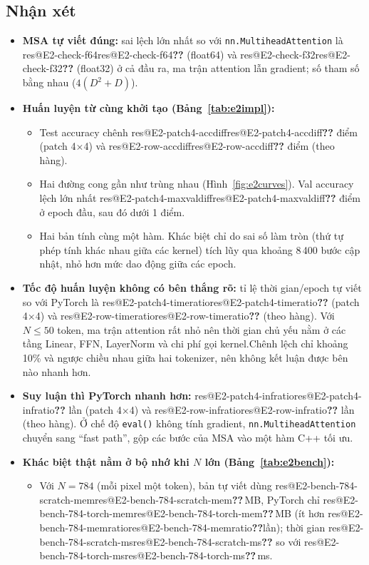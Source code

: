 \documentclass[twoside,final]{hcmut-report}
\makeatletter
\newcommand{\res}[1]{\ifcsname res@#1\endcsname\csname res@#1\endcsname\else\textbf{??}\fi}
\makeatother
\begin{document}
\subsection{Nhận xét}
\begin{itemize}
  \item \textbf{MSA tự viết đúng:} sai lệch lớn nhất so với \texttt{nn.MultiheadAttention} là
        \res{E2-check-f64} (float64) và \res{E2-check-f32} (float32) ở cả đầu ra, ma trận attention lẫn gradient; số tham số bằng nhau ($4(D^2+D)$).
  \item \textbf{Huấn luyện từ cùng khởi tạo (Bảng~\ref{tab:e2impl}):}
        \begin{itemize}
          \item Test accuracy chênh \res{E2-patch4-accdiff} điểm (patch 4$\times$4) và \res{E2-row-accdiff} điểm (theo hàng).
          \item Hai đường cong gần như trùng nhau (Hình~\ref{fig:e2curves}). Val accuracy lệch lớn nhất \res{E2-patch4-maxvaldiff} điểm ở epoch đầu, sau đó dưới 1 điểm.
          \item Hai bản tính cùng một hàm. Khác biệt chỉ do sai số làm tròn (thứ tự phép tính khác nhau giữa các kernel) tích lũy qua khoảng 8\,400 bước cập nhật, nhỏ hơn mức dao động giữa các epoch.
        \end{itemize}
  \item \textbf{Tốc độ huấn luyện không có bên thắng rõ:} tỉ lệ thời gian/epoch tự viết so với PyTorch là \res{E2-patch4-timeratio} (patch 4$\times$4) và \res{E2-row-timeratio} (theo hàng). Với $N\le 50$ token, ma trận attention rất nhỏ nên thời gian chủ yếu nằm ở các tầng Linear, FFN, LayerNorm và chi phí gọi kernel.Chênh lệch chỉ khoảng 10\% và ngược chiều nhau giữa hai tokenizer, nên không kết luận được bên nào nhanh hơn.
  \item \textbf{Suy luận thì PyTorch nhanh hơn:} \res{E2-patch4-infratio} lần (patch 4$\times$4) và \res{E2-row-infratio} lần (theo hàng). Ở chế độ \texttt{eval()} không tính gradient, \texttt{nn.MultiheadAttention} chuyển sang ``fast path'', gộp các bước của MSA vào một hàm C++ tối ưu.
  \item \textbf{Khác biệt thật nằm ở bộ nhớ khi $N$ lớn (Bảng~\ref{tab:e2bench}):}
        \begin{itemize}
          \item Với $N=784$ (mỗi pixel một token), bản tự viết dùng \res{E2-bench-784-scratch-mem}\,MB, PyTorch chỉ \res{E2-bench-784-torch-mem}\,MB (ít hơn \res{E2-bench-784-memratio}lần); thời gian \res{E2-bench-784-scratch-ms} so với \res{E2-bench-784-torch-ms}\,ms.

\end{itemize}
\end{itemize}
\end{document}
